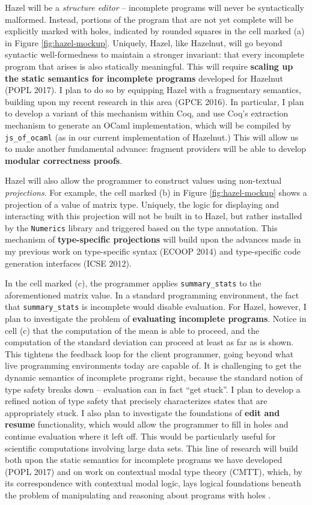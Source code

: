 \documentclass[9pt]{extarticle}
\let\li\lstinline
\begin{document}
Hazel will be a \emph{structure editor} -- incomplete programs will never be syntactically malformed. Instead, portions of the program that are not yet complete will be explicitly marked with holes, indicated by rounded squares in the cell marked (a) in Figure \ref{fig:hazel-mockup}. Uniquely, Hazel, like Hazelnut, will go beyond syntactic well-formedness to maintain a stronger invariant: that every incomplete program that arises is also statically meaningful. This will require \textbf{scaling up the static semantics for incomplete programs} developed for Hazelnut (POPL 2017). I plan to do so by equipping Hazel with a fragmentary semantics, building upon my recent research in this area (GPCE 2016). In particular, I plan to develop a variant of this mechanism within Coq, and use Coq's extraction mechanism to generate an OCaml implementation, which will be compiled by \li{js_of_ocaml} (as in our current implementation of Hazelnut.) This will allow us to make another fundamental advance: fragment providers will be able to develop \textbf{modular correctness proofs}.

Hazel will also allow the programmer to construct values using non-textual \emph{projections}. For example, the cell marked (b) in Figure \ref{fig:hazel-mockup} shows  a projection of a value of matrix type.  Uniquely, the logic for displaying and interacting with this projection will not be built in to Hazel, but rather installed by the \li{Numerics} library and triggered based on the type annotation. This mechanism of \textbf{type-specific projections} will build upon the advances made in my previous work on type-specific syntax (ECOOP 2014) and type-specific code generation interfaces (ICSE 2012).%

In the cell marked (c), the programmer applies \li{summary_stats} to the aforementioned matrix value. In a standard programming environment, the fact that \li{summary_stats} is incomplete would disable evaluation. For Hazel, however, I plan to investigate the problem of \textbf{evaluating incomplete programs}. Notice in cell (c) that the computation of the mean is able to proceed, and the computation of the standard deviation can proceed at least as far as is shown. This tightens the feedback loop for the client programmer, going beyond what live programming environments today are capable of. It is challenging to get the dynamic semantics of incomplete programs right, because the standard notion of type safety breaks down -- evaluation can in fact ``get stuck''. I plan to develop a refined notion of type safety that precisely characterizes states that are appropriately stuck. I also plan to investigate the foundations of \textbf{edit and resume} functionality, which would allow the programmer to fill in holes and continue evaluation where it left off. This would be particularly useful for scientific computations involving large data sets. This line of research will build both upon the static semantics for incomplete programs we have developed (POPL 2017) and on work on contextual modal type theory (CMTT), which, by its correspondence with contextual modal logic, lays logical foundations beneath the problem of manipulating and reasoning about programs with holes \cite{Nanevski2008}.
\end{document}
